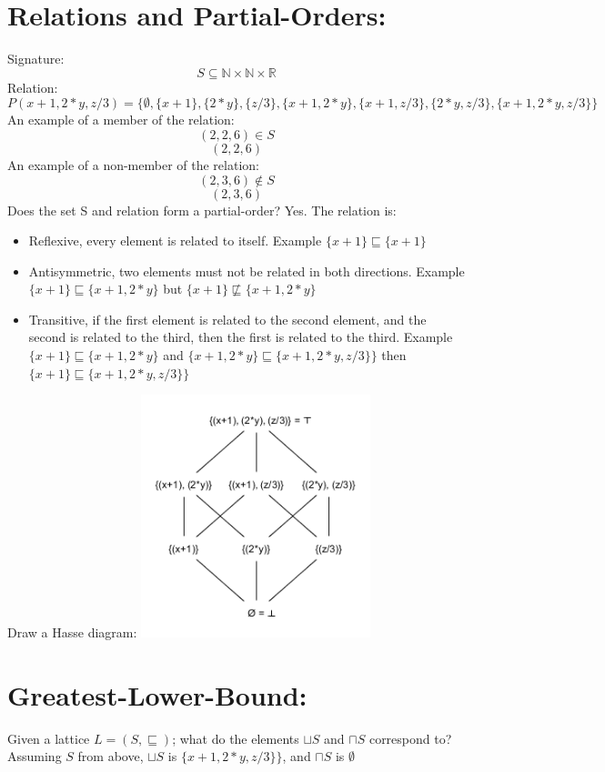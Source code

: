 \documentclass{article}
\begin{document}


\section*{Relations and Partial-Orders:}
Signature:
$$S\subseteq \mathbb{N} \times \mathbb{N} \times \mathbb{R}$$
Relation:
$$P({x+1, 2*y, z/3}) = \{\emptyset, \{x+1\}, \{2*y\}, \{z/3\}, \{x+1, 2*y\}, \{x+1, z/3\}, \{2*y, z/3\}, \{x+1, 2*y, z/3\}\}$$
An example of a member of the relation:
$$(2,2,6) \in S$$
$$(2,2,6)$$
An example of a non-member of the relation:
$$(2,3,6) \notin S$$
$$(2,3,6)$$
Does the set S and relation form a partial-order? Yes. The relation is:\\
\begin{itemize}
	\item Reflexive, every element is related to itself. Example $\{x+1\}\sqsubseteq\{x+1\}$
	\item Antisymmetric, two elements must not be related in both directions. Example $\{x+1\}\sqsubseteq\{x+1, 2*y\}$ but $\{x+1\}\not\sqsubseteq\{x+1, 2*y\}$
	\item Transitive, if the first element is related to the second element, and the second is related to the third, then the first is related to the third. Example $\{x+1\}\sqsubseteq\{x+1, 2*y\}$ and $\{x+1, 2*y\}\sqsubseteq\{x+1, 2*y, z/3\}\}$ then $\{x+1\}\sqsubseteq\{x+1, 2*y, z/3\}\}$
\end{itemize}

Draw a Hasse diagram:
\includegraphics[width=0.5\textwidth]{Hasse}


\section*{Greatest-Lower-Bound:}
Given a lattice $L = (S, \sqsubseteq)$; what do the elements $\sqcup S$ and $\sqcap S$ correspond to? Assuming $S$ from above, $\sqcup S$ is $\{x+1, 2*y, z/3\}\}$, and $\sqcap S$ is $\emptyset$
\end{document}
